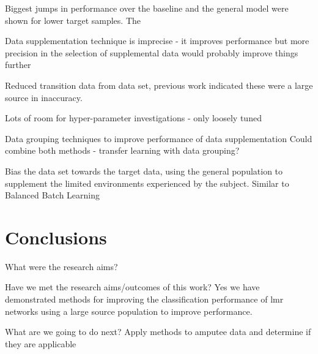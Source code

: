 Biggest jumps in performance over the baseline and the general model were shown for lower target samples. The 

Data supplementation technique is imprecise - it improves performance but more precision in the selection of supplemental data would probably improve things further 

Reduced transition data from data set, previous work indicated these were a large source in inaccuracy.


Lots of room for hyper-parameter investigations - only loosely tuned

Data grouping techniques to improve performance of data supplementation
Could combine both methods - transfer learning with data grouping?

Bias the data set towards the target data, using the general population to supplement the limited environments experienced by the subject. Similar to Balanced Batch Learning \cite{Cruciani2020}

\section{Conclusions}
\label{sec:personalisation-conclusions}
What were the research aims?

Have we met the research aims/outcomes of this work?
Yes we have demonstrated methods for improving the classification performance of \acrshort{lmr} networks using a large source population to improve performance.

What are we going to do next?
Apply methods to amputee data and determine if they are applicable